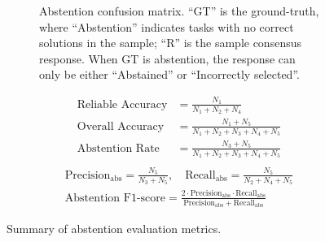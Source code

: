\documentclass[acmsmall,screen,nonacm]{acmart}
\begin{document}
\begin{figure}[t]
\centering
\begin{subfigure}[c]{0.45\textwidth}
\centering
{}
\caption{{\footnotesize Abstention confusion matrix. ``GT'' is the ground-truth, where ``Abstention'' indicates tasks with no correct solutions in the sample; ``R'' is the sample consensus response. When GT is abstention, the response can only be either ``Abstained'' or ``Incorrectly selected''.}}
\label{fig:sub-table}
\end{subfigure}
\begin{subfigure}[c]{0.5\textwidth}
\centering
\footnotesize
\begin{align*}
\text{Reliable Accuracy} &= \frac{N_1}{N_1 + N_2 + N_4} \\
\text{Overall Accuracy} &= \frac{N_1 + N_5}{N_1 + N_2 + N_3 + N_4 + N_5} \\
\text{Abstention Rate} &= \frac{N_3 + N_5}{N_1 + N_2 + N_3 + N_4 + N_5} \\
\end{align*}
\vspace{-2.3\baselineskip}
\begin{gather*}
\text{Precision}_\mathrm{abs} = \frac{N_5}{N_3 + N_5}, \quad
\text{Recall}_\mathrm{abs} = \frac{N_5}{N_2 + N_4 + N_5} \\
\text{Abstention F1-score} =  \frac{2 \cdot\text{Precision}_\mathrm{abs} \cdot \text{Recall}_\mathrm{abs}}{\text{Precision}_\mathrm{abs} + \text{Recall}_\mathrm{abs}}
\end{gather*}
\normalsize
\label{fig:sub-formulas}
\end{subfigure}
\vspace{-\baselineskip}
\caption{Summary of abstention evaluation metrics.\label{fig:abstention_matrix}}
\vspace{-2mm}
\end{figure}
\end{document}
